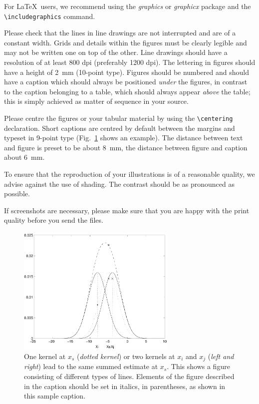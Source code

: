 \documentclass[runningheads,a4paper]{llncs}
\begin{document}
For \LaTeX\ users, we recommend using the \emph{graphics} or \emph{graphicx}
package and the \verb+\includegraphics+ command.

Please check that the lines in line drawings are not
interrupted and are of a constant width. Grids and details within the
figures must be clearly legible and may not be written one on top of
the other. Line drawings should have a resolution of at least 800 dpi
(preferably 1200 dpi). The lettering in figures should have a height of
2~mm (10-point type). Figures should be numbered and should have a
caption which should always be positioned \emph{under} the figures, in
contrast to the caption belonging to a table, which should always appear
\emph{above} the table; this is simply achieved as matter of sequence in
your source.

Please centre the figures or your tabular material by using the \verb+\centering+
declaration. Short captions are centred by default between the margins
and typeset in 9-point type (Fig.~\ref{fig:example} shows an example).
The distance between text and figure is preset to be about 8~mm, the
distance between figure and caption about 6~mm.

To ensure that the reproduction of your illustrations is of a reasonable
quality, we advise against the use of shading. The contrast should be as
pronounced as possible.

If screenshots are necessary, please make sure that you are happy with
the print quality before you send the files.

\begin{figure}
	\centering
	\includegraphics[height=6.2cm]{graphic.pdf}
	\caption{One kernel at $x_s$ (\emph{dotted kernel}) or two kernels at
	$x_i$ and $x_j$ (\textit{left and right}) lead to the same summed estimate
	at $x_s$. This shows a figure consisting of different types of
	lines. Elements of the figure described in the caption should be set in
	italics, in parentheses, as shown in this sample caption.}
	\label{fig:example}
\end{figure}
\end{document}
